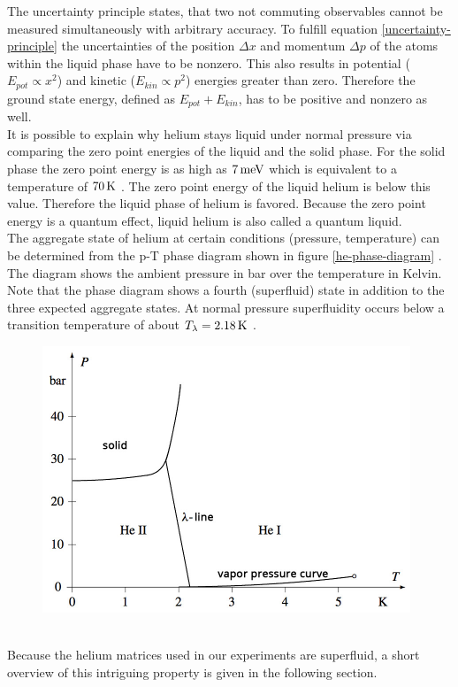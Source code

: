 \documentclass[parskip,12pt,headsepline,a4paper] {scrbook}
\begin{document}
The uncertainty principle states, that two not commuting observables cannot be measured simultaneously with arbitrary accuracy. To fulfill equation \ref{uncertainty-principle} the uncertainties of the position $\Delta x$ and momentum $\Delta p$ of the atoms within the liquid phase have to be nonzero. This also results in potential ($E_{pot} \propto x^2$) and kinetic ($E_{kin} \propto p^2$) energies greater than zero. Therefore the ground state energy, defined as $E_{pot} + E_{kin}$, has to be positive and nonzero as well. \\
It is possible to explain why helium stays liquid under normal pressure via comparing the zero point energies of the liquid and the solid phase. For the solid phase the zero point energy is as high as $\unit[7]{meV}$ which is equivalent to a temperature of $\unit[70]{K}$ \cite{lackner}. The zero point energy of the liquid helium is below this value. Therefore the liquid phase of helium is favored. Because the zero point energy is a quantum effect, liquid helium is also called a quantum liquid. \\
The aggregate state of helium at certain conditions (pressure, temperature) can be determined from the p-T phase diagram shown in figure \ref{he-phase-diagram} \cite{fliessbach}. The diagram shows the ambient pressure in bar over the temperature in Kelvin. Note that the phase diagram shows a fourth (superfluid) state in addition to the three expected aggregate states. At normal pressure superfluidity occurs below a transition temperature of about $T_\lambda = \unit[2.18]{K}$ \cite{toennis}.
\begin{figure}[ht]
\centerline{
\includegraphics[width=11cm]{./helium/phasediagram.jpg}}
\end{figure} \\
Because the helium matrices used in our experiments are superfluid, a short overview of this intriguing property is given in the following section.
\end{document}

